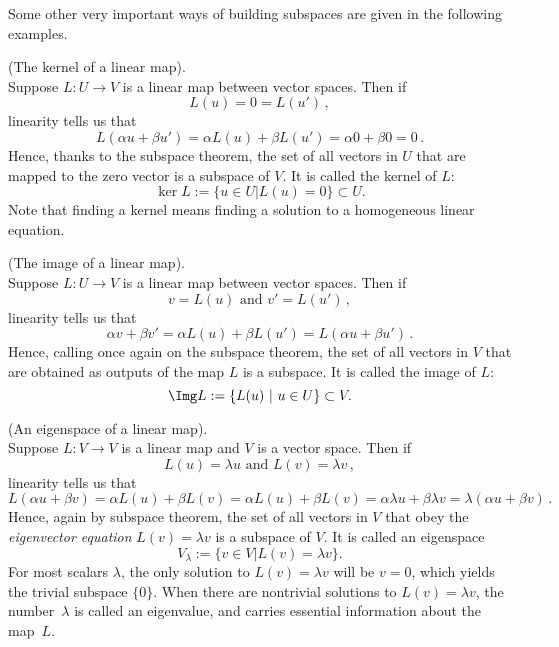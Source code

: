 Some other very important ways of building subspaces are given in the following examples.

\begin{example}
(The kernel of a linear map).\\[-2mm]

\noindent
Suppose $L:U\to V$ is a linear map between vector spaces. Then if
\[
L(u)=0=L(u')\, ,
\]
linearity tells us that
\[
L(\alpha u + \beta u') = \alpha L(u) + \beta L(u') =\alpha 0 + \beta 0 = 0\, .
\]
Hence, thanks to the subspace theorem,  the set of all vectors in $U$ that are mapped to the zero vector is a subspace of $V$.
It is called the kernel of $L$:
\[
\ker L:=\{u\in U| L(u) = 0\}\subset U.
\]
Note that finding a kernel means finding a solution to a homogeneous linear equation. 
\end{example}

\begin{example}
(The image of a linear map).\\[-2mm]

\noindent
Suppose $L:U\to V$ is a linear map between vector spaces. Then if
\[
v=L(u) \mbox{ and } v'=L(u')\, ,
\]
linearity tells us that
\[
\alpha v + \beta v' = \alpha L(u) + \beta L(u') =L(\alpha u +\beta u')\, .
\]
Hence, calling once again on the subspace theorem,  the set of all vectors in $V$ that are obtained as outputs of the
map $L$ is a subspace.
It is called the image of $L$:
\[
\Img L:=\{L(u) \ |\  u\in U \}\subset V.
\]
\end{example}

\begin{example}
(An eigenspace of a linear map).\\[-2mm]

\noindent
Suppose $L:V\to V$ is a linear map and $V$ is a vector space. Then if
\[
L(u)=\lambda u \mbox{ and } L(v)=\lambda v\, ,
\]
linearity tells us that
\[
L(\alpha u + \beta v) = \alpha L(u) + \beta L(v) =\alpha L(u) + \beta L(v) =\alpha \lambda u  + \beta \lambda v = \lambda (\alpha u + \beta v)\, .
\]
Hence, again by subspace theorem, the set of all vectors in $V$ that
obey the {\itshape eigenvector equation} $L(v)=\lambda v$ is a subspace of $V$. 
It is called an eigenspace
\[
V_\lambda:=\{v\in V| L(v) = \lambda v\}.
\]
For most scalars $\lambda$, the only solution to $L(v) = \lambda v$ will be $v=0$, which yields the trivial subspace $\{0\}$.
When there are nontrivial solutions to $L(v)=\lambda v$, the number~$\lambda$ is called an eigenvalue, and carries
essential information about the map~$L$. 
\end{example}

